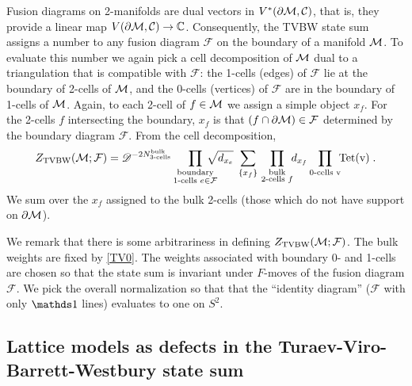 Fusion diagrams on 2-manifolds are dual vectors in $V^\ast(\partial\mathcal{M},\mathcal{C})$, that is, they provide a linear map $V(\partial\mathcal{M},\mathcal{C}) \to \mathbb{C}$.
Consequently, the TVBW state sum assigns a number to any fusion diagram $\mathcal{F}$ on the boundary of a manifold $\mathcal{M}$.
To evaluate this number we again pick a cell decomposition of $\mathcal{M}$ dual to a triangulation that is compatible with $\mathcal{F}$: the 1-cells (edges) of $\mathcal{F}$ lie at the boundary of 2-cells of $\mathcal{M}$, and the 0-cells (vertices) of $\mathcal{F}$ are in the boundary of 1-cells of $\mathcal{M}$.
Again, to each 2-cell of $f\in\mathcal{M}$ we assign a simple object $x_f$.
For the 2-cells $f$ intersecting the boundary, $x_f$ is that $(f \cap \partial\mathcal{M}) \in \mathcal{F}$ determined by the boundary diagram $\mathcal{F}$.
From the cell decomposition,
\begin{align}
	\label{TV1}
	Z_\text{TVBW}(\mcm; \mathcal{F}) =
		\mathscr{D}^{-2N^\text{bulk}_\text{3-cells}}
		\prod_{\substack{ \text{boundary}\\\text{1-cells } e\in\mathcal{F} }} \mkern-20mu\sqrt{d_{x_e}}
		\; \sum_{\{ x_f \}} \,
		\prod_{\substack{ \text{bulk}\\\text{2-cells } f }} \!\! d_{x_f}
		\prod_{\substack{ \text{0-cells } {\rm v} }} \!\! \operatorname{Tet}({\rm v})  \;.
\end{align}
We sum over the $x_f$ assigned to the bulk 2-cells (those which do not have support on $\partial \mathcal{M}$).

We remark that there is some arbitrariness in defining $Z_\text{TVBW}(\mathcal{M}; \mathcal{F})$. 
The bulk weights are fixed by \eqref{TV0}.
The weights associated with boundary 0- and 1-cells are chosen so that the state sum is invariant under $F$-moves of the fusion diagram $\mathcal{F}$.
We pick the overall normalization so that that the ``identity diagram'' ($\mathcal{F}$ with only $\I$ lines) evaluates to one on $S^2$.

\subsection{Lattice models as defects in the Turaev-Viro-Barrett-Westbury state sum}

